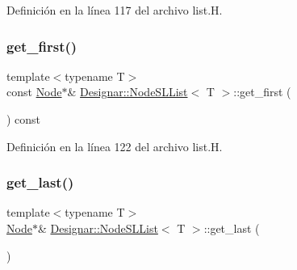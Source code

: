 Definición en la línea 117 del archivo list.\+H.

\mbox{\label{class_designar_1_1_node_s_l_list_a1644a837ab4aac745c809b021fc21dfc}} 
\subsubsection{\texorpdfstring{get\+\_\+first()}{get\_first()}\hspace{0.1cm}{\footnotesize\ttfamily [2/2]}}
{\footnotesize\ttfamily template$<$typename T$>$ \\
const \hyperlink{class_designar_1_1_node_s_l_list_a41963019ada1025099e3259207a3de96}{Node}$\ast$\& \hyperlink{class_designar_1_1_node_s_l_list}{Designar\+::\+Node\+S\+L\+List}$<$ T $>$\+::get\+\_\+first (\begin{DoxyParamCaption}{ }\end{DoxyParamCaption}) const\hspace{0.3cm}{\ttfamily [inline]}}



Definición en la línea 122 del archivo list.\+H.

\mbox{\label{class_designar_1_1_node_s_l_list_a1c42a40b92315cd21a81c1ae74b65636}} 
\subsubsection{\texorpdfstring{get\+\_\+last()}{get\_last()}\hspace{0.1cm}{\footnotesize\ttfamily [1/2]}}
{\footnotesize\ttfamily template$<$typename T$>$ \\
\hyperlink{class_designar_1_1_node_s_l_list_a41963019ada1025099e3259207a3de96}{Node}$\ast$\& \hyperlink{class_designar_1_1_node_s_l_list}{Designar\+::\+Node\+S\+L\+List}$<$ T $>$\+::get\+\_\+last (\begin{DoxyParamCaption}{ }\end{DoxyParamCaption})\hspace{0.3cm}{\ttfamily [inline]}}



